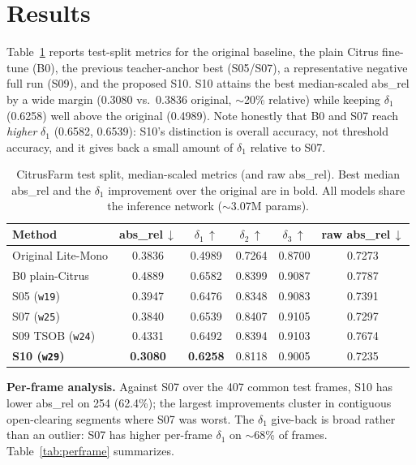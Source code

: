 \documentclass[conference]{IEEEtran}
\newcommand{\dn}{$\downarrow$}
\newcommand{\up}{$\uparrow$}
\newcommand{\best}[1]{\textbf{#1}}
\begin{document}
\section{Results}
\label{sec:results}
Table~\ref{tab:main} reports test-split metrics for the original baseline, the
plain Citrus fine-tune (B0), the previous teacher-anchor best (S05/S07), a
representative negative full run (S09), and the proposed S10. S10 attains the
best median-scaled abs\_rel by a wide margin (0.3080 vs.\ 0.3836 original, $\sim$20\%
relative) while keeping $\delta_1$ (0.6258) well above the original (0.4989).
Note honestly that B0 and S07 reach \emph{higher} $\delta_1$ (0.6582, 0.6539):
S10's distinction is overall accuracy, not threshold accuracy, and it gives back
a small amount of $\delta_1$ relative to S07.

\begin{table}[t]
\centering
\caption{CitrusFarm test split, median-scaled metrics (and raw abs\_rel).
Best median abs\_rel and the $\delta_1$ improvement over the original are in
bold. All models share the inference network ($\sim$3.07M params).}
\label{tab:main}
\footnotesize
\setlength{\tabcolsep}{4pt}
\begin{tabular}{@{}lccccc@{}}
\toprule
Method & abs\_rel\,\dn & $\delta_1$\,\up & $\delta_2$\,\up & $\delta_3$\,\up & raw abs\_rel\,\dn \\
\midrule
Original Lite-Mono & 0.3836 & 0.4989 & 0.7264 & 0.8700 & 0.7273 \\
B0 plain-Citrus    & 0.4889 & 0.6582 & 0.8399 & 0.9087 & 0.7787 \\
S05 (\texttt{w19}) & 0.3947 & 0.6476 & 0.8348 & 0.9083 & 0.7391 \\
S07 (\texttt{w25}) & 0.3840 & 0.6539 & 0.8407 & 0.9105 & 0.7297 \\
S09 TSOB (\texttt{w24}) & 0.4331 & 0.6492 & 0.8394 & 0.9103 & 0.7674 \\
\textbf{S10 (\texttt{w29})} & \best{0.3080} & \best{0.6258} & 0.8118 & 0.9005 & 0.7235 \\
\bottomrule
\end{tabular}
\end{table}

\textbf{Per-frame analysis.} Against S07 over the 407 common test frames, S10 has
lower abs\_rel on 254 (62.4\%); the largest improvements cluster in contiguous
open-clearing segments where S07 was worst. The $\delta_1$ give-back is broad
rather than an outlier: S07 has higher per-frame $\delta_1$ on $\sim$68\% of
frames. Table~\ref{tab:perframe} summarizes.
\end{document}
